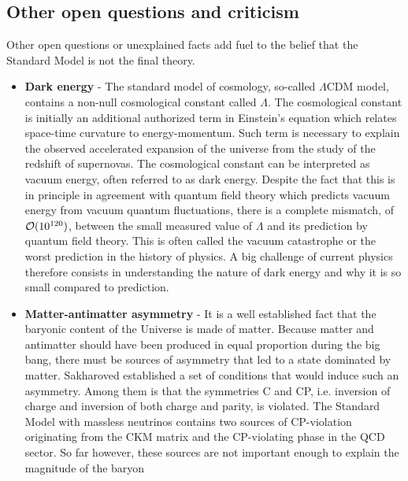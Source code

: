        \subsection{Other open questions and criticism}

    Other open questions or unexplained facts add fuel to the belief that the Standard Model
    is not the final theory.

    \begin{itemize}
        \item \textbf{Dark energy} - The standard model of cosmology, so-called $\Lambda$CDM model,
            contains a non-null cosmological constant called $\Lambda$. The cosmological
            constant is initially an additional authorized term in Einstein's equation
            which relates space-time curvature to energy-momentum. Such term is necessary
            to explain the observed accelerated expansion of the universe from the study
            of the redshift of supernovas. The cosmological constant can be interpreted
            as vacuum energy, often referred to as dark energy. Despite the fact that this
            is in principle in agreement with quantum field theory which predicts vacuum
            energy from vacuum quantum fluctuations, there is a complete mismatch, of $\mathcal{O}(10^{120})$,
            between the small measured value of $\Lambda$ and its prediction
            by quantum field theory. This is often called the vacuum catastrophe or the worst
            prediction in the history of physics. A big challenge of current physics therefore
            consists in understanding the nature of dark energy and why it is so small
            compared to prediction.
        \item \textbf{Matter-antimatter asymmetry} - It is a well established fact that
            the baryonic content of the Universe is made of matter. Because matter and antimatter
            should have been produced in equal proportion during the big bang, there must
            be sources of asymmetry that led to a state dominated by matter. Sakharoved
            established a set of conditions that would
            induce such an asymmetry. Among them is that the symmetries C and CP, i.e. inversion
            of charge and inversion of both charge and parity, is violated. The Standard Model
            with massless neutrinos contains two sources of CP-violation originating from
            the CKM matrix and the CP-violating phase in the QCD sector. So far however,
            these sources are not important enough to explain the magnitude of the baryon

\end{itemize}
